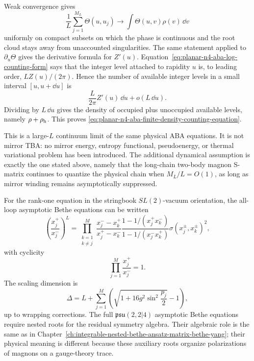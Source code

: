 Weak convergence gives
\[
  \frac1L\sum_{j=1}^{M_L}\Theta(u,u_j)
  \longrightarrow
  \int\Theta(u,v)\rho(v)\,\dd v
\]
uniformly on compact subsets on which the phase is continuous and the root
cloud stays away from unaccounted singularities.  The same statement applied
to \(\partial_u\Theta\) gives the derivative formula for \(Z'(u)\).
Equation~\eqref{eq:planar-n4-aba-log-counting-form} says that the integer
level attached to rapidity \(u\) is, to leading order, \(LZ(u)/(2\pi)\).  Hence
the number of available integer levels in a small interval \([u,u+\dd u]\) is
\[
  \frac{L}{2\pi}Z'(u)\,\dd u+o(L\,\dd u).
\]
Dividing by \(L\,\dd u\) gives the density of occupied plus unoccupied
available levels, namely \(\rho+\rho_{\rm h}\).  This proves
\eqref{eq:planar-n4-aba-finite-density-counting-equation}.

This is a large-\(L\) continuum limit of the same physical ABA equations.  It
is not mirror TBA: no mirror energy, entropy functional, pseudoenergy, or
thermal variational problem has been introduced.  The additional dynamical
assumption is exactly the one stated above, namely that the long-chain
two-body magnon S-matrix continues to quantize the physical chain when
\(M_L/L=O(1)\), as long as mirror winding remains asymptotically suppressed.

For the rank-one equation in the stringbook \(SL(2)\)-vacuum orientation, the
all-loop asymptotic Bethe equations can be written
\begin{equation}
  \left(\frac{x_j^+}{x_j^-}\right)^L
  =
  \prod_{\substack{k=1\\ k\neq j}}^M
  \frac{x_j^- -x_k^+}{x_j^+ -x_k^-}
  \frac{1-1/(x_j^+x_k^-)}{1-1/(x_j^-x_k^+)}
  \sigma(x_j^\pm,x_k^\pm)^2 ,
  \label{eq:planar-n4-rank-one-stringbook-aba}
\end{equation}
with cyclicity
\[
  \prod_{j=1}^M\frac{x_j^+}{x_j^-}=1.
\]
The scaling dimension is
\[
  \Delta
  =
  L+\sum_{j=1}^M\left(
    \sqrt{1+16g^2\sin^2\frac{p_j}{2}}-1
  \right),
\]
up to wrapping corrections.  The full
\(\mathfrak{psu}(2,2|4)\) asymptotic Bethe equations require nested roots
for the residual symmetry algebra.  Their algebraic role is the same as in
Chapter~\ref{ch:integrable-nested-bethe-ansatz-matrix-bethe-yang}; their
physical meaning is different because these auxiliary roots organize
polarizations of magnons on a gauge-theory trace.

